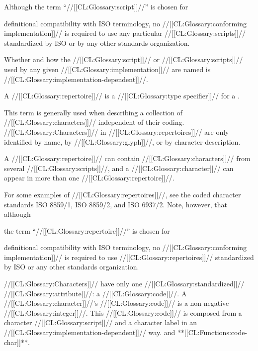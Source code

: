 
Although the term ``//[[CL:Glossary:script]]//'' is chosen for 

definitional  compatibility with ISO terminology, no //[[CL:Glossary:conforming implementation]]//  is required to use any particular //[[CL:Glossary:scripts]]// standardized by ISO or by any other standards organization.

 Whether and how the //[[CL:Glossary:script]]// or //[[CL:Glossary:scripts]]// used by any given //[[CL:Glossary:implementation]]// are named is //[[CL:Glossary:implementation-dependent]]//.

\endsubsubsection%

 

 A //[[CL:Glossary:repertoire]]// is a //[[CL:Glossary:type specifier]]// for a .

This term is generally used when describing a collection of //[[CL:Glossary:characters]]// independent of their coding. //[[CL:Glossary:Characters]]// in //[[CL:Glossary:repertoires]]// are only identified
    by name,
    by //[[CL:Glossary:glyph]]//, or
    by character description.

A //[[CL:Glossary:repertoire]]// can contain //[[CL:Glossary:characters]]// from several //[[CL:Glossary:scripts]]//, and a //[[CL:Glossary:character]]// can appear in more than one //[[CL:Glossary:repertoire]]//.

 For some examples of //[[CL:Glossary:repertoires]]//, see the coded character standards ISO 8859/1, ISO 8859/2, and ISO 6937/2. Note, however, that although

the term ``//[[CL:Glossary:repertoire]]//'' is chosen for 

definitional  compatibility with ISO terminology, no //[[CL:Glossary:conforming implementation]]//  is required to use //[[CL:Glossary:repertoires]]// standardized by ISO or any other  standards organization.

\endsubsubsection%

\endsubSection%

 

 //[[CL:Glossary:Characters]]// have only one //[[CL:Glossary:standardized]]// //[[CL:Glossary:attribute]]//: a //[[CL:Glossary:code]]//.  A //[[CL:Glossary:character]]//'s //[[CL:Glossary:code]]// is a non-negative //[[CL:Glossary:integer]]//. This //[[CL:Glossary:code]]// is composed from a character //[[CL:Glossary:script]]// and a character label in an //[[CL:Glossary:implementation-dependent]]// way.   and **[[CL:Functions:code-char]]**.

